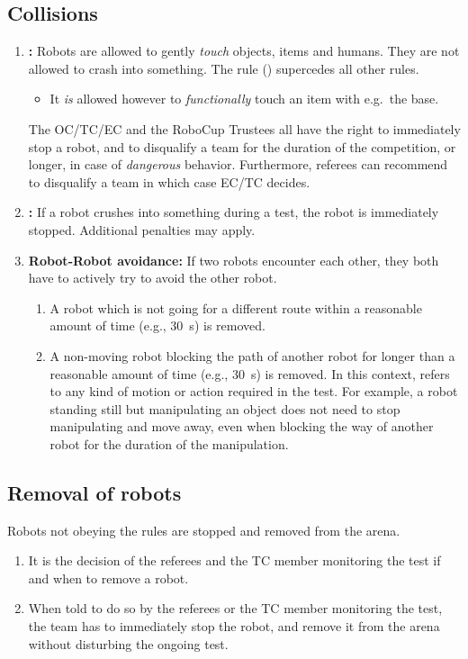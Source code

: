\subsection{Collisions}
\begin{enumerate}
	\item \textbf{:} Robots are allowed to gently \emph{touch} objects, items and humans. 	They are not allowed to crash into something. The  rule () supercedes all other rules.
	\begin{itemize}
		\item It \emph{is} allowed however to \emph{functionally} touch an item with e.g.~the base.
	\end{itemize}
	The OC/TC/EC and the RoboCup Trustees all have the right to immediately stop a robot, and to disqualify a team for the duration of the competition, or longer, in case of \emph{dangerous} behavior. Furthermore, referees can recommend to disqualify a team in which case EC/TC decides.
	\item \textbf{:} If a robot crushes into something during a test, the robot is immediately stopped.	Additional penalties may apply. 
	\item \textbf{Robot-Robot avoidance:} If two robots encounter each other, they both have to actively try to avoid the other robot.
	\begin{enumerate}
		\item A robot which is not going for a different route within a reasonable amount of time (e.g., \SI{30}{\second}) is removed.
		\item A non-moving robot blocking the path of another robot for longer than a reasonable amount of time (e.g., \SI{30}{\second}) is removed. In this context,  refers to any kind of motion or action required in the test. For example, a robot standing still but manipulating an object does not need to stop manipulating and move away, even when blocking the way of another robot for the duration of the manipulation.
	\end{enumerate}
\end{enumerate}



\subsection{Removal of robots}
\label{rule:robot_removal}
Robots not obeying the rules are stopped and removed from the arena.
\begin{enumerate}
	\item It is the decision of the referees and the TC member monitoring the test if and when to remove a robot.
	\item When told to do so by the referees or the TC member monitoring the test, the team has to immediately stop the robot, and remove it from the arena without disturbing the ongoing test.
\end{enumerate}


